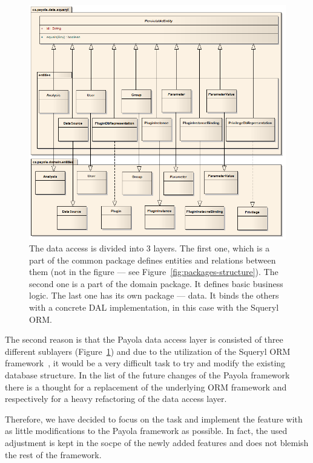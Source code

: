 \begin{figure}
	\centering
	\includegraphics[width=140mm]{img/data_entities.png}
	\caption{The data access is divided into 3 layers. The first one, which is a part of
	the common package defines entities and relations between them (not in the figure ---
	see Figure~\ref{fig:packages-structure}).
	The second one is a part of the domain package. It defines basic business logic.
	The last one has its own package --- data. It binds the others with a concrete DAL
	implementation, in this case with the Squeryl ORM. ~\cite{payola-devguide}}
	\label{fig:3-layers}
\end{figure}

The second reason is that the Payola data access layer is consisted of three different sublayers
(Figure~\ref{fig:3-layers}) and 
due to the utilization of the Squeryl ORM framework~\cite{squeryl}, it would be a very difficult 
task to try and modify the existing database structure. In the list of the future changes of 
the Payola framework there is a thought for a replacement of the underlying ORM framework
and respectively for a 
heavy refactoring of the data access layer.

Therefore, we have decided to focus on the task and implement the feature with 
as little modifications to the Payola framework as possible. In fact, the used adjustment is
kept in the socpe of the newly added features and does not blemish the rest of the framework.

